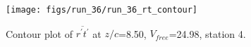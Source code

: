 \begin{figure}[H]
\centering
\texttt{[image: figs/run\_36/run\_36\_rt\_contour]}
\caption{Contour plot of $\overline{r^\prime t^\prime}$ at $z/c$=8.50, $V_{free}$=24.98, station 4.}
\label{fig:run_36_rt_contour}
\end{figure}


